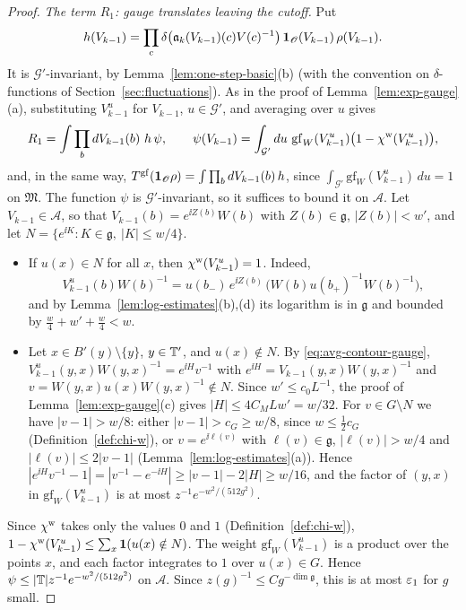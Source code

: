 \begin{proof}
\emph{The term $R_1$: gauge translates leaving the cutoff.} Put
\[
h(V_{k-1})=\prod_c\delta\big(\mathfrak a_k(V_{k-1})(c)V(c)^{-1}\big)\,\mathbf 1_{\mathscr O}(V_{k-1})\,\rho(V_{k-1}).
\]
It is $\mathcal G'$-invariant, by Lemma~\ref{lem:one-step-basic}(b) (with the convention on $\delta$-functions of Section~\ref{sec:fluctuations}). As in the proof of Lemma~\ref{lem:exp-gauge}(a), substituting $V_{k-1}^u$ for $V_{k-1}$, $u\in\mathcal G'$, and averaging over $u$ gives
\[
R_1=\int\prod_bdV_{k-1}(b)\ h\,\psi,\qquad\psi(V_{k-1})=\int_{\mathcal G'}du\ \mathrm{gf}_W(V_{k-1}^u)\big(1-\chi^{\rm w}(V_{k-1}^u)\big),
\]
and, in the same way, $T^{\rm gf}(\mathbf 1_{\mathscr O}\rho)=\int\prod_bdV_{k-1}(b)\,h$, since $\int_{\mathcal G'}\mathrm{gf}_W(V_{k-1}^u)\,du=1$ on $\mathfrak M$. The function $\psi$ is $\mathcal G'$-invariant, so it suffices to bound it on $\mathscr A$. Let $V_{k-1}\in\mathscr A$, so that $V_{k-1}(b)=e^{\ii Z(b)}W(b)$ with $Z(b)\in\mathfrak g$, $|Z(b)|<w'$, and let $N=\{e^{\ii K}:K\in\mathfrak g,\ |K|\le w/4\}$.
\begin{itemize}
\item If $u(x)\in N$ for all $x$, then $\chi^{\rm w}(V_{k-1}^u)=1$. Indeed,
\[
V_{k-1}^u(b)W(b)^{-1}=u(b_-)\,e^{\ii Z(b)}\,\big(W(b)u(b_+)^{-1}W(b)^{-1}\big),
\]
and by Lemma~\ref{lem:log-estimates}(b),(d) its logarithm is in $\mathfrak g$ and bounded by $\frac w4+w'+\frac w4<w$.
\item Let $x\in B'(y)\setminus\{y\}$, $y\in\mathbb T'$, and $u(x)\notin N$. By \eqref{eq:avg-contour-gauge}, $V_{k-1}^u(y,x)W(y,x)^{-1}=e^{\ii H}v^{-1}$ with $e^{\ii H}=V_{k-1}(y,x)W(y,x)^{-1}$ and $v=W(y,x)u(x)W(y,x)^{-1}\notin N$. Since $w'\le c_0L^{-1}$, the proof of Lemma~\ref{lem:exp-gauge}(c) gives $|H|\le4C_MLw'=w/32$. For $v\in G\setminus N$ we have $|v-1|>w/8$: either $|v-1|>c_G\ge w/8$, since $w\le\frac12c_G$ (Definition~\ref{def:chi-w}), or $v=e^{\ii\ell(v)}$ with $\ell(v)\in\mathfrak g$, $|\ell(v)|>w/4$ and $|\ell(v)|\le2|v-1|$ (Lemma~\ref{lem:log-estimates}(a)). Hence $|e^{\ii H}v^{-1}-1|=|v^{-1}-e^{-\ii H}|\ge|v-1|-2|H|\ge w/16$, and the factor of $(y,x)$ in $\mathrm{gf}_W(V_{k-1}^u)$ is at most $z^{-1}e^{-w^2/(512g^2)}$.
\end{itemize}
Since $\chi^{\rm w}$ takes only the values $0$ and $1$ (Definition~\ref{def:chi-w}), $1-\chi^{\rm w}(V_{k-1}^u)\le\sum_x\mathbf 1(u(x)\notin N)$. The weight $\mathrm{gf}_W(V_{k-1}^u)$ is a product over the points $x$, and each factor integrates to $1$ over $u(x)\in G$. Hence $\psi\le|\mathbb T|z^{-1}e^{-w^2/(512g^2)}$ on $\mathscr A$. Since $z(g)^{-1}\le Cg^{-\dim\mathfrak g}$, this is at most $\varepsilon_1$ for $g$ small.


\end{proof}
